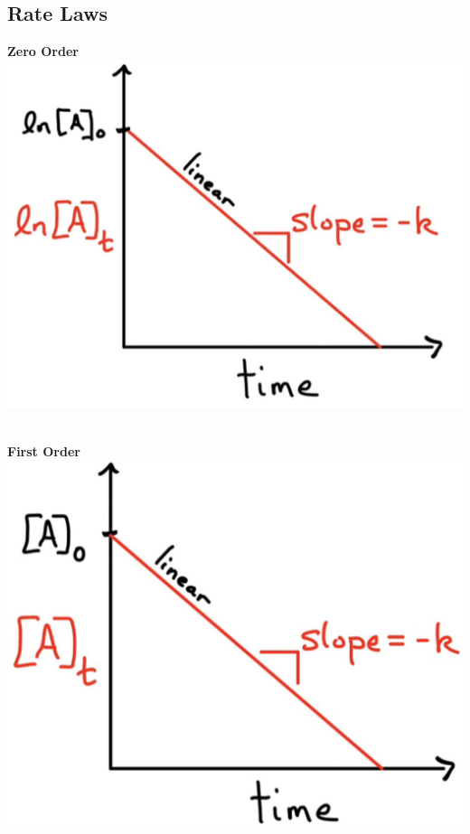 \subsection{Rate Laws}
\begin{minipage}{0.33\linewidth}
    \begin{center}
        \textbf{Zero Order}\\
        \includegraphics[width = \linewidth]{images/0 order.jpeg}\\
        \\
    \end{center}
    
\end{minipage}
\begin{minipage}{0.33\linewidth}
    \begin{center}
        \textbf{First Order}\\
        \includegraphics[width = \linewidth]{images/1st Order.jpeg}\\
        \\
    \end{center}
    
\end{minipage}
